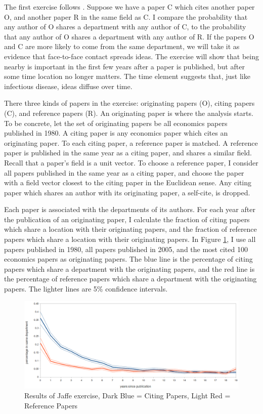 \documentclass[]{article}
\makeatletter
\def\maxwidth{\ifdim\Gin@nat@width>\linewidth\linewidth
\else\Gin@nat@width\fi}
\let\Oldincludegraphics\includegraphics
\renewcommand{\includegraphics}[1]{\Oldincludegraphics[width=\maxwidth]{#1}}
\makeatother
\begin{document}
The first exercise follows \citet{jaffe1993geographic}. Suppose we have 
a paper C which cites another paper O, and another paper R in the same
field as C.  I compare the probability that any author of O shares a
department with any author of C, to the probability that any author of O
shares a department with any author of R.  If the papers O and C are more likely
to come from the same department, we will take it as evidence that
face-to-face contact spreads ideas. The exercise will show that being
nearby is important in the first few years after a paper is published,
but after some time location no longer matters. The time element
suggests that, just like infectious disease, ideas diffuse over time.

There three kinds of papers in the exercise: originating papers (O), citing
papers (C), and reference papers (R). An originating paper is where the analysis
starts. To be concrete, let the set of originating papers be all
economics papers published in 1980. A citing paper is any economics
paper which cites an originating paper. To each citing paper, a
reference paper is matched. A reference paper is published in the same
year as a citing paper, and shares a similar field. Recall that a
paper's field is a unit vector. To choose a reference paper, I consider
all papers published in the same year as a citing paper, and choose the
paper with a field vector closest to the citing paper in the Euclidean
sense. Any citing paper which shares an author with its originating
paper, a self-cite, is dropped.

Each paper is associated with the departments of its authors. For each
year after the publication of an originating paper, I calculate the
fraction of citing papers which share a location with their originating
papers, and the fraction of reference papers which share a location with
their originating papers. In Figure \ref{fig:jaf_ex}, I use all papers published in
1980, all papers published in 2005, and the most cited 100 economics
papers as originating papers. The blue line is the percentage of citing
papers which share a department with the originating papers, and the red
line is the percentage of reference papers which share a department with
the originating papers. The lighter lines are 5\% confidence intervals.

\begin{figure}[htbp]
\centering
\includegraphics{pics/jaf_results_pooled.png}
\caption{Results of Jaffe exercise, Dark Blue = Citing Papers, Light Red =
Reference Papers}
\label{fig:jaf_ex}
\end{figure}
\end{document}
